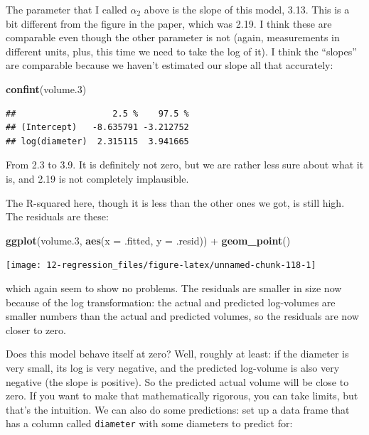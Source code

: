 \documentclass[]{tufte-book}
\newenvironment{Shaded}{}{}
\newcommand{\DataTypeTok}[1]{\textcolor[rgb]{0.56,0.13,0.00}{#1}}
\newcommand{\FloatTok}[1]{\textcolor[rgb]{0.25,0.63,0.44}{#1}}
\newcommand{\KeywordTok}[1]{\textcolor[rgb]{0.00,0.44,0.13}{\textbf{#1}}}
\newcommand{\NormalTok}[1]{#1}
\newcommand{\OperatorTok}[1]{\textcolor[rgb]{0.40,0.40,0.40}{#1}}
\newcommand{\StringTok}[1]{\textcolor[rgb]{0.25,0.44,0.63}{#1}}
\theoremstyle{definition}
\theoremstyle{definition}
\theoremstyle{definition}
\theoremstyle{remark}
\begin{document}
The parameter that I called \(\alpha_2\) above is the slope of this
model, 3.13. This is a bit different from the figure in the paper, which
was 2.19. I think these are comparable even though the other parameter
is not (again, measurements in different units, plus, this time we need
to take the log of it). I think the ``slopes'' are comparable because we
haven't estimated our slope all that accurately:

\begin{Shaded}
\begin{Highlighting}[]
\KeywordTok{confint}\NormalTok{(volume}\FloatTok{.3}\NormalTok{)}
\end{Highlighting}
\end{Shaded}

\begin{verbatim}
##                   2.5 %    97.5 %
## (Intercept)   -8.635791 -3.212752
## log(diameter)  2.315115  3.941665
\end{verbatim}

From 2.3 to 3.9. It is definitely not zero, but we are rather less sure
about what it is, and 2.19 is not completely implausible.

The R-squared here, though it is less than the other ones we got, is
still high. The residuals are these:

\begin{Shaded}
\begin{Highlighting}[]
\KeywordTok{ggplot}\NormalTok{(volume}\FloatTok{.3}\NormalTok{, }\KeywordTok{aes}\NormalTok{(}\DataTypeTok{x =}\NormalTok{ .fitted, }\DataTypeTok{y =}\NormalTok{ .resid)) }\OperatorTok{+}\StringTok{ }
\StringTok{    }\KeywordTok{geom_point}\NormalTok{()}
\end{Highlighting}
\end{Shaded}

\texttt{[image: 12-regression\_files/figure-latex/unnamed-chunk-118-1]}

which again seem to show no problems. The residuals are smaller in size
now because of the log transformation: the actual and predicted
log-volumes are smaller numbers than the actual and predicted volumes,
so the residuals are now closer to zero.

Does this model behave itself at zero? Well, roughly at least: if the
diameter is very small, its log is very negative, and the predicted
log-volume is also very negative (the slope is positive). So the
predicted actual volume will be close to zero. If you want to make that
mathematically rigorous, you can take limits, but that's the intuition.
We can also do some predictions: set up a data frame that has a column
called \texttt{diameter} with some diameters to predict for:
\end{document}
